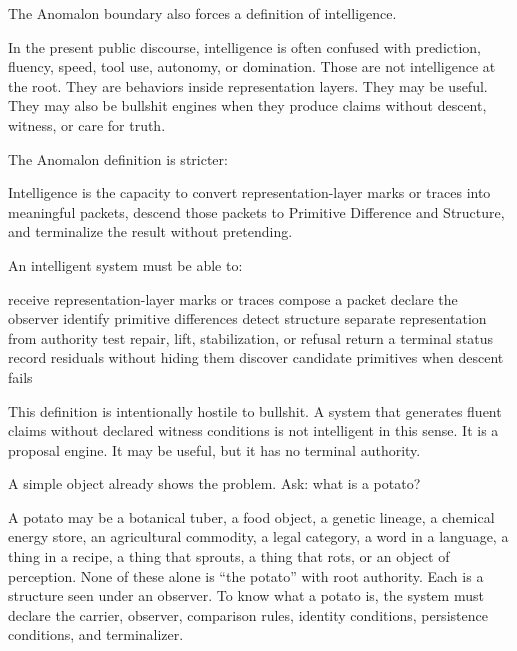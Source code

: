 \documentclass[
  10pt,
]{article}
\newenvironment{Shaded}{}{}
\newcommand{\NormalTok}[1]{#1}
\begin{document}
The Anomalon boundary also forces a definition of intelligence.

In the present public discourse, intelligence is often confused with prediction, fluency, speed, tool use, autonomy, or domination. Those are not intelligence at the root. They are behaviors inside representation layers. They may be useful. They may also be bullshit engines when they produce claims without descent, witness, or care for truth.

The Anomalon definition is stricter:

\begin{Shaded}
\begin{Highlighting}[]
\NormalTok{Intelligence is the capacity to convert representation{-}layer marks or traces into meaningful packets,}
\NormalTok{descend those packets to Primitive Difference and Structure,}
\NormalTok{and terminalize the result without pretending.}
\end{Highlighting}
\end{Shaded}

An intelligent system must be able to:

\begin{Shaded}
\begin{Highlighting}[]
\NormalTok{receive representation{-}layer marks or traces}
\NormalTok{compose a packet}
\NormalTok{declare the observer}
\NormalTok{identify primitive differences}
\NormalTok{detect structure}
\NormalTok{separate representation from authority}
\NormalTok{test repair, lift, stabilization, or refusal}
\NormalTok{return a terminal status}
\NormalTok{record residuals without hiding them}
\NormalTok{discover candidate primitives when descent fails}
\end{Highlighting}
\end{Shaded}

This definition is intentionally hostile to bullshit. A system that generates fluent claims without declared witness conditions is not intelligent in this sense. It is a proposal engine. It may be useful, but it has no terminal authority.

A simple object already shows the problem. Ask: what is a potato?

A potato may be a botanical tuber, a food object, a genetic lineage, a chemical energy store, an agricultural commodity, a legal category, a word in a language, a thing in a recipe, a thing that sprouts, a thing that rots, or an object of perception. None of these alone is ``the potato'' with root authority. Each is a structure seen under an observer. To know what a potato is, the system must declare the carrier, observer, comparison rules, identity conditions, persistence conditions, and terminalizer.
\end{document}
